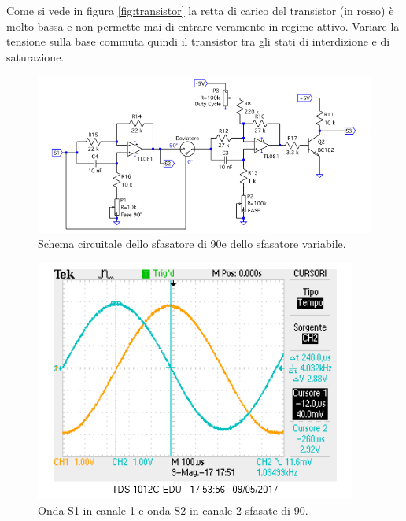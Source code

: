 \documentclass[10pt,a4paper]{article}
\begin{document}
Come si vede in figura \ref{fig:transistor} la retta di carico del transistor (in rosso) è molto bassa e non permette mai di entrare veramente in regime attivo. Variare la tensione sulla base commuta quindi il transistor tra gli stati di interdizione e di saturazione.\\


 

\begin{figure}[!htb]
  \centering
  \includegraphics[scale=0.75]{sfasatori.png}
\caption{Schema circuitale dello sfasatore di 90\degree e dello sfasatore variabile.\label{fig:sfasatori}}
\end{figure}

\begin{figure}[!htb]
  \centering
  \includegraphics[scale=0.75]{sfasamento90.png}
\caption{Onda S1 in canale 1 e onda S2 in canale 2 sfasate di 90\degree.\label{osc:sfasamento}}
\end{figure}
\end{document}
